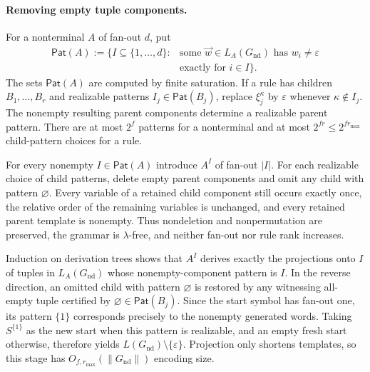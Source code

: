 \documentclass[11pt]{article}
\numberwithin{equation}{section}
\theoremstyle{plain}
\theoremstyle{definition}
\theoremstyle{remark}
\newcommand{\tuple}[1]{\vec{#1}}
\newcommand{\eps}{\varepsilon}
\begin{document}
\paragraph{Removing empty tuple components.}
For a nonterminal $A$ of fan-out $d$, put
\[
\begin{aligned}
  \mathsf{Pat}(A):=\bigl\{I\subseteq\{1,\ldots,d\}:{}&
       \text{some }\tuple w\in L_A(G_{\mathrm{nd}})\text{ has }w_i\ne\eps\\
       &\text{exactly for }i\in I\bigr\}.
\end{aligned}
\]
The sets $\mathsf{Pat}(A)$ are computed by finite saturation.  If a rule has
children $B_1,\ldots,B_r$ and realizable patterns
$I_j\in\mathsf{Pat}(B_j)$, replace $\xi_j^{\kappa}$ by $\eps$ whenever $\kappa\notin I_j$.
The nonempty resulting parent components determine a realizable parent pattern.
There are at most $2^f$ patterns for a nonterminal and at most
$2^{fr}\le2^{f r_{\max}}$ child-pattern choices for a rule.

For every nonempty $I\in\mathsf{Pat}(A)$ introduce $A^I$ of fan-out $|I|$.
For each realizable choice of child patterns, delete empty parent components
and omit any child with pattern $\varnothing$.  Every variable of a retained
child component still occurs exactly once, the relative order of the remaining
variables is unchanged, and every retained parent template is nonempty.  Thus
nondeletion and nonpermutation are preserved, the grammar is $\lambda$-free,
and neither fan-out nor rule rank increases.

Induction on derivation trees shows that $A^I$ derives exactly the projections
onto $I$ of tuples in $L_A(G_{\mathrm{nd}})$ whose nonempty-component pattern is $I$.  In the
reverse direction, an omitted child with pattern $\varnothing$ is restored by
any witnessing all-empty tuple certified by
$\varnothing\in\mathsf{Pat}(B_j)$.  Since the start symbol has fan-out one,
its pattern $\{1\}$ corresponds precisely to the nonempty generated words.
Taking $S^{\{1\}}$ as the new start when this pattern is realizable, and an
empty fresh start otherwise, therefore yields $L(G_{\mathrm{nd}})\setminus\{\eps\}$.
Projection only shortens templates, so this stage has
$O_{f,r_{\max}}(\|G_{\mathrm{nd}}\|)$ encoding size.
\end{document}
